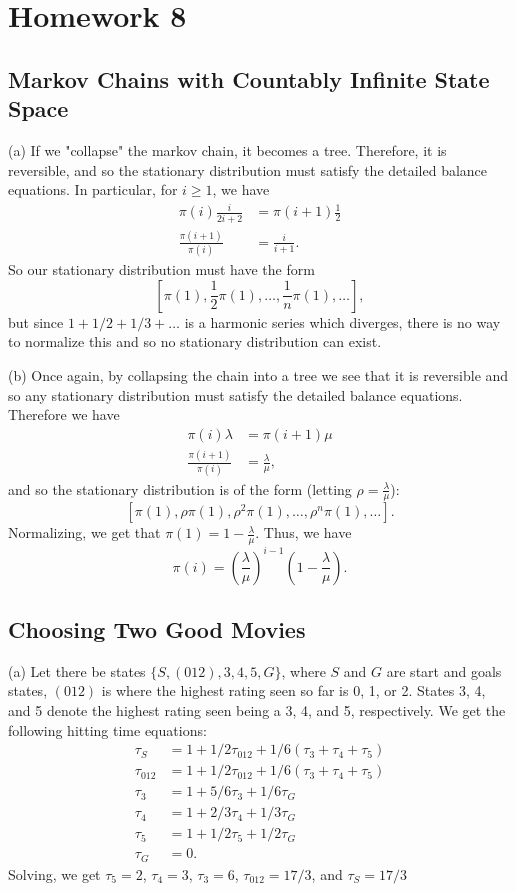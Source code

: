 \section{Homework 8}

\subsection{Markov Chains with Countably Infinite State Space}

(a) If we "collapse" the markov chain, it becomes a tree. Therefore, it is reversible, and so the stationary distribution must satisfy the detailed balance equations. In particular, for $i \geq 1$, we have
\begin{align*}
\pi(i)\frac{i}{2i + 2} &= \pi(i + 1)\frac{1}{2} \\
\frac{\pi(i + 1)}{\pi(i)} &= \frac{i}{i + 1}.
\end{align*} 
So our stationary distribution must have the form
\[
\left[\pi(1), \frac{1}{2}\pi(1), \dots, \frac{1}{n}\pi(1), \dots\right],
\]
but since $1 + 1/2 + 1/3 + \dots$ is a harmonic series which diverges, there is no way to normalize this and so no stationary distribution can exist.

(b) Once again, by collapsing the chain into a tree we see that it is reversible and so any stationary distribution must satisfy the detailed balance equations. Therefore we have
\begin{align*}
    \pi(i)\lambda &= \pi(i + 1)\mu \\
    \frac{\pi(i + 1)}{\pi(i)} &= \frac{\lambda}{\mu},
\end{align*}
and so the stationary distribution is of the form (letting $\rho = \frac{\lambda}{\mu}$):
\[
\left[\pi(1), \rho\pi(1), \rho^2\pi(1), \dots, \rho^n\pi(1), \dots\right].
\]
Normalizing, we get that $\pi(1) = 1 - \frac{\lambda}{\mu}$. Thus, we have
\[
\pi(i) = \left(\frac{\lambda}{\mu}\right)^{i - 1}\left(1 - \frac{\lambda}{\mu}\right).
\]


\subsection{Choosing Two Good Movies}

(a) Let there be states $\{S, (012), 3, 4, 5, G\}$, where $S$ and $G$ are start and goals states, $(012)$ is where the highest rating seen so far is 0, 1, or 2. States 3, 4, and 5 denote the highest rating seen being a 3, 4, and 5, respectively. We get the following hitting time equations:
\begin{align*}
    \tau_S &= 1 + 1/2\tau_{012} + 1/6(\tau_3 + \tau_4 + \tau_5) \\
    \tau_{012} &= 1 + 1/2\tau_{012} + 1/6(\tau_3 + \tau_4 + \tau_5) \\
    \tau_3 &= 1 + 5/6\tau_3 + 1/6\tau_G \\
    \tau_4 &= 1 + 2/3\tau_4 + 1/3\tau_G \\
    \tau_5 &= 1 + 1/2\tau_5 + 1/2\tau_G \\
    \tau_G &= 0.
\end{align*}
Solving, we get $\tau_{5} = 2$, $\tau_4 = 3$, $\tau_3 = 6$, $\tau_{012} = 17/3$, and $\tau_S = \boxed{17/3}$

